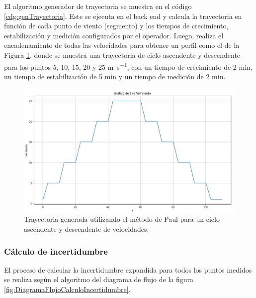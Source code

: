 El algoritmo generador de trayectoria se muestra en el código \ref{cdg:genTrayectoria}. Este se ejecuta en el back end y calcula la trayectoria en función de cada punto de viento (segmento) y los tiempos de crecimiento, estabilización y medición configurados por el operador. Luego, realiza el encadenamiento de todas las velocidades para obtener un perfil como el de la Figura \ref{fig:trayectoriaGenerada}, donde se muestra una trayectoria de ciclo ascendente y descendente para los puntos 5, 10, 15, 20 y 25 \unit{\meter\per\second}, con un tiempo de crecimiento de 2 \unit{\minute}, un tiempo de estabilización de 5 \unit{\minute} y un tiempo de medición de 2 \unit{\minute}.

\begin{figure}[H]
    \centering
    \includegraphics[width=0.7\linewidth]{Figuras/AplicacionWeb/backend/trayectoriaGenerada.jpg}
    \caption{Trayectoria generada utilizando el método de Paul para un ciclo ascendente y descendente de velocidades.}
    \label{fig:trayectoriaGenerada}
\end{figure}
\subsubsection{Cálculo de incertidumbre}\label{sec:calculoIncertidumbre}

El proceso de calcular la incertidumbre expandida para todos los puntos medidos se realiza según el algoritmo del diagrama de flujo de la figura \ref{fig:DiagramaFlujoCalculoIncertidumbre}.

